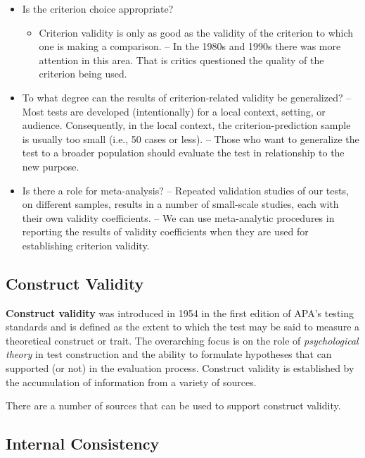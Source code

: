\documentclass[
  english,
]{book}
\providecommand{\tightlist}{%
  \setlength{\itemsep}{0pt}\setlength{\parskip}{0pt}}
\begin{document}
\begin{itemize}
\tightlist
\item
  Is the criterion choice appropriate?

  \begin{itemize}
  \tightlist
  \item
    Criterion validity is only as good as the validity of the criterion to which one is making a comparison.
    -- In the 1980s and 1990s there was more attention in this area. That is critics questioned the quality of the criterion being used.
  \end{itemize}
\item
  To what degree can the results of criterion-related validity be generalized?
  -- Most tests are developed (intentionally) for a local context, setting, or audience. Consequently, in the local context, the criterion-prediction sample is usually too small (i.e., 50 cases or less).
  -- Those who want to generalize the test to a broader population should evaluate the test in relationship to the new purpose.
\item
  Is there a role for meta-analysis?
  -- Repeated validation studies of our tests, on different samples, results in a number of small-scale studies, each with their own validity coefficients.
  -- We can use meta-analytic procedures in reporting the results of validity coefficients when they are used for establishing criterion validity.
\end{itemize}

\hypertarget{construct-validity}{%
\subsection{Construct Validity}\label{construct-validity}}

\textbf{Construct validity} was introduced in 1954 in the first edition of APA's testing standards and is defined as the extent to which the test may be said to measure a theoretical construct or trait. The overarching focus is on the role of \emph{psychological theory} in test construction and the ability to formulate hypotheses that can supported (or not) in the evaluation process. Construct validity is established by the accumulation of information from a variety of sources.

There are a number of sources that can be used to support construct validity.

\hypertarget{internal-consistency}{%
\subsection{Internal Consistency}\label{internal-consistency}}
\end{document}
